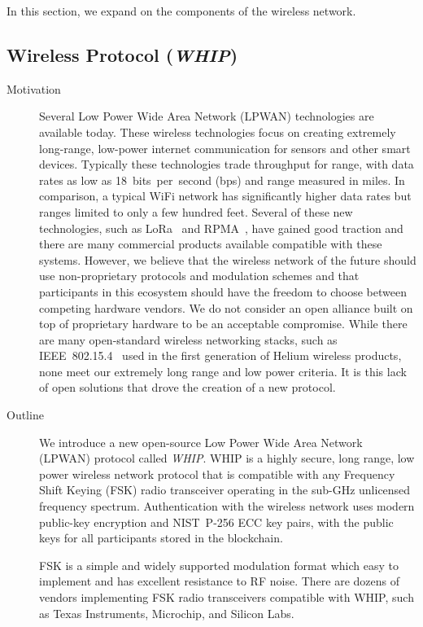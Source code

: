 \documentclass[10pt, nonatbib, nocopyrightspace, reprint]{sigplanconf}
\begin{document}
In this section, we expand on the components of the wireless network.

\subsection{Wireless Protocol (\emph{WHIP})}\label{whip}

\begin{description}
        \item [Motivation] Several Low Power Wide Area Network (LPWAN) technologies are available today. These wireless technologies focus on creating extremely long-range, low-power internet communication for sensors and other smart devices. Typically these technologies trade throughput for range, with data rates as low as 18~bits~per~second (bps) and range measured in miles. In comparison, a typical WiFi network has significantly higher data rates but ranges limited to only a few hundred feet. Several of these new technologies, such as LoRa~\cite{lora} and RPMA~\cite{rpma}, have gained good traction and there are many commercial products available compatible with these systems. However, we believe that the wireless network of the future should use non-proprietary protocols and modulation schemes and that participants in this ecosystem should have the freedom to choose between competing hardware vendors. We do not consider an open alliance built on top of proprietary hardware to be an acceptable compromise. While there are many open-standard wireless networking stacks, such as IEEE~802.15.4~\cite{ieee802_15_4} used in the first generation of Helium wireless products, none meet our extremely long range and low power criteria. It is this lack of open solutions that drove the creation of a new protocol.

        \item [Outline] We introduce a new open-source Low Power Wide Area Network (LPWAN) protocol called \emph{WHIP}. WHIP is a highly secure, long range, low power wireless network protocol that is compatible with any Frequency Shift Keying (FSK) radio transceiver operating in the sub-GHz unlicensed frequency spectrum. Authentication with the wireless network uses modern public-key encryption and NIST~P-256 ECC key pairs, with the public keys for all participants stored in the blockchain.

        FSK is a simple and widely supported modulation format which easy to implement and has excellent resistance to RF noise. There are dozens of vendors implementing FSK radio transceivers compatible with WHIP, such as Texas Instruments, Microchip, and Silicon Labs.


\end{description}
\end{document}

